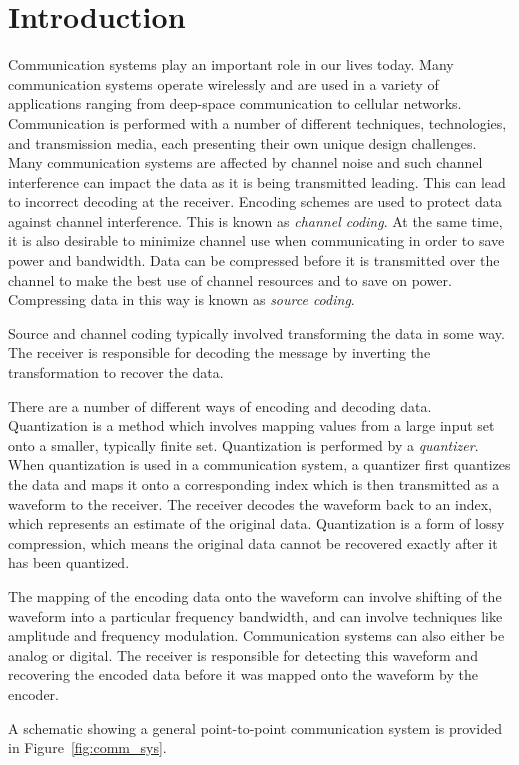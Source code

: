 \documentclass[10pt]{article}
\begin{document}
\section{Introduction}
Communication systems play an important role in our lives today. Many communication systems operate wirelessly and are used in a variety of applications ranging from deep-space communication to cellular networks. Communication is performed with a number of different techniques, technologies, and transmission media, each presenting their own unique design challenges. Many communication systems are affected by channel noise and such channel interference can impact the data as it is being transmitted leading. This can lead to incorrect decoding at the receiver. Encoding schemes are used to protect data against channel interference. This is known as \emph{channel coding}. At the same time, it is also desirable to minimize channel use when communicating in order to save power and bandwidth. Data can be compressed before it is transmitted over the channel to make the best use of channel resources and to save on power. Compressing data in this way is known as \emph{source coding}.

Source and channel coding typically involved transforming the data in some way. The receiver is responsible for decoding the message by inverting the transformation to recover the data.

There are a number of different ways of encoding and decoding data. Quantization is a method which involves mapping values from a large input set onto a smaller, typically finite set. Quantization is performed by a \emph{quantizer}. When quantization is used in a communication system, a quantizer first quantizes the data and maps it onto a corresponding index which is then transmitted as a waveform to the receiver. The receiver decodes the waveform back to an index, which represents an estimate of the original data. Quantization is a form of lossy compression, which means the original data cannot be recovered exactly after it has been quantized.

The mapping of the encoding data onto the waveform can involve shifting of the waveform into a particular frequency bandwidth, and can involve techniques like amplitude and frequency modulation. Communication systems can also either be analog or digital. The receiver is responsible for detecting this waveform and recovering the encoded data before it was mapped onto the waveform by the encoder.

A schematic showing a general point-to-point communication system is provided in Figure~\ref{fig:comm_sys}.
\end{document}
